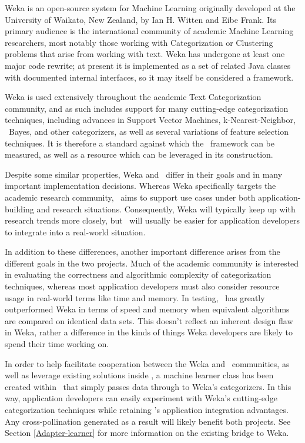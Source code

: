 Weka is an open-source system for Machine Learning originally
developed at the University of Waikato, New Zealand, by Ian H. Witten
and Eibe Frank.\cite{weka:99} Its primary
audience is the international community of academic Machine Learning
researchers, most notably those working with Categorization or
Clustering problems that arise from working with text.  Weka has
undergone at least one major code rewrite; at present it is
implemented as a set of related Java classes with documented internal
interfaces, so it may itself be considered a framework.

Weka is used extensively throughout the academic Text Categorization
community, and as such includes support for many cutting-edge
categorization techniques, including advances in Support Vector
Machines, k-Nearest-Neighbor, \naive\ Bayes, and other categorizers, as
well as several variations of feature selection techniques.  It is
therefore a standard against which the \aicat\ framework can
be measured, as well as a resource which can be leveraged in its
construction.

Despite some similar properties, Weka and \aicat\ differ in
their goals and in many important implementation decisions.  Whereas
Weka specifically targets the academic research community,
\aicat\ aims to support use cases under both
application-building and research situations.
Consequently, Weka will typically keep up with research trends more
closely, but \aicat\ will usually be easier for application
developers to integrate into a real-world situation.

In addition to these differences, another important difference arises
from the different goals in the two projects.  Much of the academic
community is interested in evaluating the correctness and algorithmic
complexity of categorization techniques, whereas most application
developers must also consider resource usage in real-world terms like
time and memory.  In testing, \aicat\ has greatly outperformed
Weka in terms of speed and memory when equivalent algorithms are
compared on identical data sets.  This doesn't reflect an inherent
design flaw in Weka, rather a difference in the kinds of things Weka
developers are likely to spend their time working on.

In order to help facilitate cooperation between the Weka and
\aicat\ communities, as well as leverage existing solutions
inside \aicat, a machine learner class has been created
within \aicat\ that simply passes data through to Weka's
categorizers.  In this way, application developers can easily
experiment with Weka's cutting-edge categorization techniques while
retaining \aicat's application integration advantages.  Any
cross-pollination generated as a result will likely benefit both
projects.  See Section \ref{Adapter-learner} for more information on
the existing bridge to Weka.

